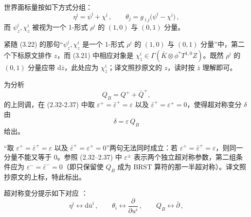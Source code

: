 世界面标量按如下方式分组：
\begin{equation}\tag{3.22}
\eta^{\bar\imath}=\psi^{\bar\imath}+\chi^{\bar\imath}\,,\qquad
\theta_j=g_{\bar\imath j}\bigl(\psi^{\bar\imath}-\chi^{\bar\imath}\bigr)\,,
\end{equation}
而 $\psi^i_z,\chi^i_z$ 被视为一个 1-形式 $\rho^i$ 的 $(1,0)$ 与 $(0,1)$ 分量。
\begin{yizhu}[原文疑误]
紧随 (3.22) 的那句“$\psi^i_z,\chi^i_z$ 是一个 1-形式 $\rho^i$ 的 $(1,0)$ 与 $(0,1)$ 分量”中，第二个下标原文排作 $z$，而 (3.21) 中相应对象是 $\chi^i_{\bar z}\in\Gamma(\bar K\otimes\phi^*T^{1,0}Z)$。既然 $\rho^i$ 的 $(0,1)$ 分量应带 $\mathrm{d}\bar z$，此处应为 $\chi^i_{\bar z}$；译文照抄原文的 $z$，读时按 $\bar z$ 理解即可。
\end{yizhu}

为分析
\[
Q_B=Q^++\bar Q^+,
\]
的上同调，在 (2.32-2.37) 中取 $\varepsilon^+=\bar\varepsilon^+=\varepsilon$ 以及 $\bar\varepsilon^+=\varepsilon^+=0$，使得超对称变分 $\delta$ 由
\[
\delta=\varepsilon\,Q_B
\]
给出。
\begin{yizhu}[原文疑误]
“取 $\varepsilon^+=\bar\varepsilon^+=\varepsilon$ 以及 $\bar\varepsilon^+=\varepsilon^+=0$”两句无法同时成立：若 $\varepsilon^+=\bar\varepsilon^+=\varepsilon$，则同一分量不能又等于 $0$。参照 (2.32--2.37) 中 $\varepsilon^{\pm}$ 表示两个独立超对称参数，第二组条件应为 $\varepsilon^-=\bar\varepsilon^-=0$（即只保留使 $Q_B$ 成为 BRST 算符的那一半超对称）。译文照抄原文的上标，特此标出。
\end{yizhu}

超对称变分提示如下对应 \cite{ref6}：
\begin{equation}\tag{3.23}
\eta^{\bar\imath}\leftrightarrow \mathrm{d}\bar u^{\bar\imath}\,,\qquad
\theta_i\leftrightarrow\frac{\partial}{\partial u^i}\,,\qquad
Q_B\leftrightarrow\bar\partial\,,
\end{equation}

